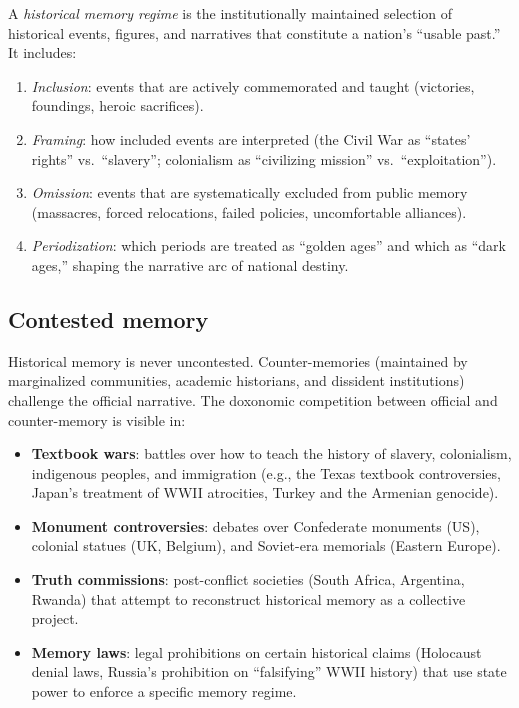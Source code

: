 \begin{definition}
\label{def:memory-regime}
A \emph{historical memory regime} is the institutionally maintained selection of historical events, figures, and narratives that constitute a nation's ``usable past.''
It includes:
\begin{enumerate}[nosep]
  \item \emph{Inclusion}: events that are actively commemorated and taught (victories, foundings, heroic sacrifices).
  \item \emph{Framing}: how included events are interpreted (the Civil War as ``states' rights'' vs.\ ``slavery''; colonialism as ``civilizing mission'' vs.\ ``exploitation'').
  \item \emph{Omission}: events that are systematically excluded from public memory (massacres, forced relocations, failed policies, uncomfortable alliances).
  \item \emph{Periodization}: which periods are treated as ``golden ages'' and which as ``dark ages,'' shaping the narrative arc of national destiny.
\end{enumerate}
\end{definition}

\subsection{Contested memory}

Historical memory is never uncontested.
Counter-memories (maintained by marginalized communities, academic historians, and dissident institutions) challenge the official narrative.
The doxonomic competition between official and counter-memory is visible in:
\begin{itemize}[nosep]
  \item \textbf{Textbook wars}: battles over how to teach the history of slavery, colonialism, indigenous peoples, and immigration (e.g., the Texas textbook controversies, Japan's treatment of WWII atrocities, Turkey and the Armenian genocide).
  \item \textbf{Monument controversies}: debates over Confederate monuments (US), colonial statues (UK, Belgium), and Soviet-era memorials (Eastern Europe).
  \item \textbf{Truth commissions}: post-conflict societies (South Africa, Argentina, Rwanda) that attempt to reconstruct historical memory as a collective project.
  \item \textbf{Memory laws}: legal prohibitions on certain historical claims (Holocaust denial laws, Russia's prohibition on ``falsifying'' WWII history) that use state power to enforce a specific memory regime.
\end{itemize}

